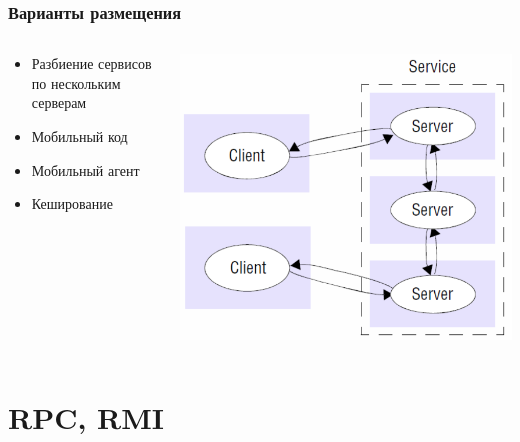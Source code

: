 \documentclass[xetex,mathserif,serif]{beamer}
\begin{document}
    \begin{frame}
        \frametitle{Варианты размещения}
        \begin{columns}
            \begin{column}{0.6\textwidth}
                \begin{itemize}
                    \item Разбиение сервисов по нескольким серверам
                    \item Мобильный код
                    \item Мобильный агент
                    \item Кеширование
                \end{itemize}
            \end{column}
            \begin{column}{0.4\textwidth}
                \begin{center}
                    \includegraphics[width=\textwidth]{clientServer.png}
                \end{center}
            \end{column}
        \end{columns}
    \end{frame}

    \section{RPC, RMI}
\end{document}
